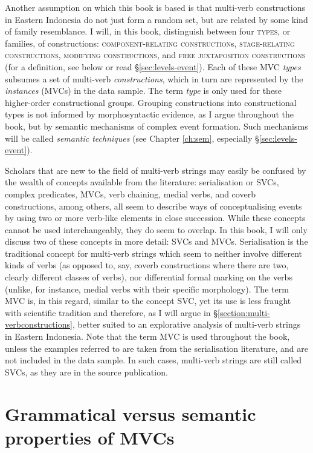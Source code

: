 Another assumption on which this book is based is that multi-verb constructions in Eastern Indonesia do not just form a random set, but are related by some kind of family resemblance. I will, in this book, distinguish between four \textsc{types}, or families, of constructions: \textsc{component-relating construction}s, \textsc{stage-rela\-ting constructions}, \textsc{modifying constructions}, and \textsc{free juxtaposition constructions} (for a definition, see below or read §\ref{sec:levels-event}). Each of these MVC \emph{types} subsumes a set of multi-verb \emph{constructions}, which in turn are represented by the \emph{instances} (MVCs) in the data sample. The term \textit{type} is only used for these higher-order constructional groups. Grouping constructions into constructional types is not informed by morphosyntactic evidence, as I argue throughout the book, but by semantic mechanisms of complex event formation. Such mechanisms will be called \textit{semantic techniques} (see Chapter \ref{ch:sem}, especially §\ref{sec:levels-event}).

Scholars that are new to the field of multi-verb strings may easily be confused by the wealth of concepts available from the literature: serialisation or SVCs, complex predicates, MVCs, verb chaining, medial verbs, and coverb constructions, among others, all seem to describe ways of conceptualising events by using two or more verb-like elements in close succession. While these concepts cannot be used interchangeably, they do seem to overlap. In this book, I will only discuss two of these concepts in more detail: SVCs and MVCs. Serialisation is the traditional concept for multi-verb strings which seem to neither involve different kinds of verbs (as opposed to, say, coverb constructions where there are two, clearly different classes of verbs), nor differential formal marking on the verbs (unlike, for instance, medial verbs with their specific morphology). The term MVC is, in this regard, similar to the concept SVC, yet its use is less fraught with scientific tradition and therefore, as I will argue in §\ref{section:multi-verbconstructions}, better suited to an explorative analysis of multi-verb strings in Eastern Indonesia. Note that the term MVC is used throughout the book, unless the examples referred to are taken from the serialisation literature, and are not included in the data sample. In such cases, multi-verb strings are still called SVCs, as they are in the source publication.

\section*{Grammatical versus semantic properties of MVCs}

